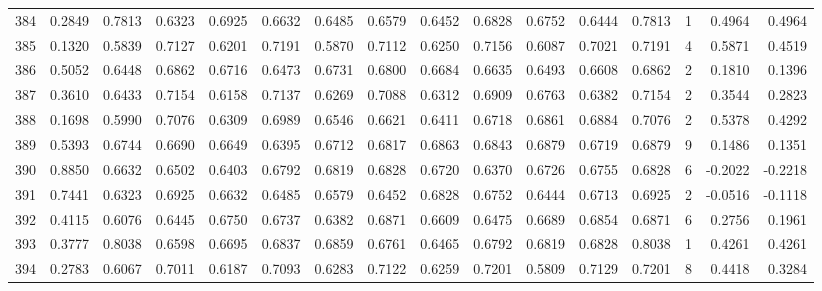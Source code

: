 \begin{tabular}{lrrrrrrrrrrrrrrr}
384 &      0.2849 &  0.7813 &  0.6323 &  0.6925 &  0.6632 &  0.6485 &  0.6579 &  0.6452 &  0.6828 &  0.6752 &   0.6444 &     0.7813 &      1 &                    0.4964 &                     0.4964 \\
385 &      0.1320 &  0.5839 &  0.7127 &  0.6201 &  0.7191 &  0.5870 &  0.7112 &  0.6250 &  0.7156 &  0.6087 &   0.7021 &     0.7191 &      4 &                    0.5871 &                     0.4519 \\
386 &      0.5052 &  0.6448 &  0.6862 &  0.6716 &  0.6473 &  0.6731 &  0.6800 &  0.6684 &  0.6635 &  0.6493 &   0.6608 &     0.6862 &      2 &                    0.1810 &                     0.1396 \\
387 &      0.3610 &  0.6433 &  0.7154 &  0.6158 &  0.7137 &  0.6269 &  0.7088 &  0.6312 &  0.6909 &  0.6763 &   0.6382 &     0.7154 &      2 &                    0.3544 &                     0.2823 \\
388 &      0.1698 &  0.5990 &  0.7076 &  0.6309 &  0.6989 &  0.6546 &  0.6621 &  0.6411 &  0.6718 &  0.6861 &   0.6884 &     0.7076 &      2 &                    0.5378 &                     0.4292 \\
389 &      0.5393 &  0.6744 &  0.6690 &  0.6649 &  0.6395 &  0.6712 &  0.6817 &  0.6863 &  0.6843 &  0.6879 &   0.6719 &     0.6879 &      9 &                    0.1486 &                     0.1351 \\
390 &      0.8850 &  0.6632 &  0.6502 &  0.6403 &  0.6792 &  0.6819 &  0.6828 &  0.6720 &  0.6370 &  0.6726 &   0.6755 &     0.6828 &      6 &                   -0.2022 &                    -0.2218 \\
391 &      0.7441 &  0.6323 &  0.6925 &  0.6632 &  0.6485 &  0.6579 &  0.6452 &  0.6828 &  0.6752 &  0.6444 &   0.6713 &     0.6925 &      2 &                   -0.0516 &                    -0.1118 \\
392 &      0.4115 &  0.6076 &  0.6445 &  0.6750 &  0.6737 &  0.6382 &  0.6871 &  0.6609 &  0.6475 &  0.6689 &   0.6854 &     0.6871 &      6 &                    0.2756 &                     0.1961 \\
393 &      0.3777 &  0.8038 &  0.6598 &  0.6695 &  0.6837 &  0.6859 &  0.6761 &  0.6465 &  0.6792 &  0.6819 &   0.6828 &     0.8038 &      1 &                    0.4261 &                     0.4261 \\
394 &      0.2783 &  0.6067 &  0.7011 &  0.6187 &  0.7093 &  0.6283 &  0.7122 &  0.6259 &  0.7201 &  0.5809 &   0.7129 &     0.7201 &      8 &                    0.4418 &                     0.3284 \\

\end{tabular}
